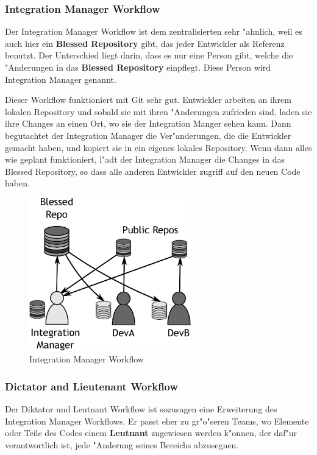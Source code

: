 \subsubsection{Integration Manager Workflow}
Der Integration Manager Workflow ist dem zentralisierten sehr "ahnlich, weil es auch hier ein \textbf{Blessed Repository} gibt, das jeder Entwickler als Referenz 
benutzt. Der Unterschied liegt darin, dass es nur eine Person gibt, welche die "Anderungen in das \textbf{Blessed Repository} einpflegt. Diese Person wird 
Integration Manager genannt.

Dieser Workflow funktioniert mit Git sehr gut. Entwickler arbeiten an ihrem lokalen Repository und sobald sie mit ihren "Anderungen zufrieden sind, laden sie ihre
Changes an einen Ort, wo sie der Integration Manger sehen kann. Dann begutachtet der Integration Manager die Ver"anderungen, die die Entwickler gemacht haben, und
kopiert sie in ein eigenes lokales Repository. Wenn dann alles wie geplant funktioniert, l"adt der Integration Manager die Changes in das Blessed Repository, so dass
alle anderen Entwickler zugriff auf den neuen Code haben. 

\begin{figure}[bt]
	\centering
	\includegraphics[width=7cm]{images/f-w1-d2.pdf}
	\caption{Integration Manager Workflow}
\end{figure}

\subsubsection{Dictator and Lieutenant Workflow}

Der Diktator und Leutnant Workflow ist sozusagen eine Erweiterung des Integration Manager Workflows. Er passt eher zu gr"o"seren Teams, wo Elemente oder Teile des
Codes einem \textbf{Leutnant} zugewiesen werden k"onnen, der daf"ur verantwortlich ist, jede "Anderung seines Bereichs abzusegnen.

